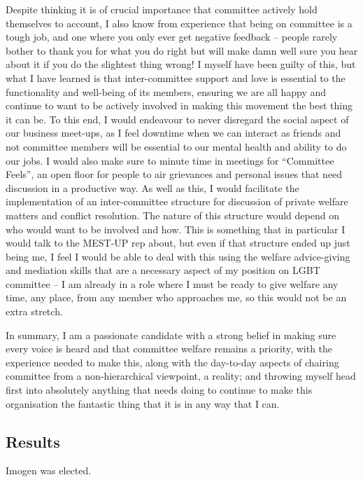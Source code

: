 \documentclass[a4paper, 11pt]{article} %
\begin{document}
\begin{onehalfspacing}
Despite thinking it is of crucial importance that committee actively hold themselves to account, I also know from experience that being on committee is a tough job, and one where you only ever get negative feedback – people rarely bother to thank you for what you do right but will make damn well sure you hear about it if you do the slightest thing wrong! I myself have been guilty of this, but what I have learned is that inter-committee support and love is essential to the functionality and well-being of its members, ensuring we are all happy and continue to want to be actively involved in making this movement the best thing it can be. To this end, I would endeavour to never disregard the social aspect of our business meet-ups, as I feel downtime when we can interact as friends and not committee members will be essential to our mental health and ability to do our jobs. I would also make sure to minute time in meetings for “Committee Feels”, an open floor for people to air grievances and personal issues that need discussion in a productive way. As well as this, I would facilitate the implementation of an inter-committee structure for discussion of private welfare matters and conflict resolution. The nature of this structure would depend on who would want to be involved and how. This is something that in particular I would talk to the MEST-UP rep about, but even if that structure ended up just being me, I feel I would be able to deal with this using the welfare advice-giving and mediation skills that are a necessary aspect of my position on LGBT committee – I am already in a role where I must be ready to give welfare any time, any place, from any member who approaches me, so this would not be an extra stretch.

In summary, I am a passionate candidate with a strong belief in making sure every voice is heard and that committee welfare remains a priority, with the experience needed to make this, along with the day-to-day aspects of chairing committee from a non-hierarchical viewpoint, a reality; and throwing myself head first into absolutely anything that needs doing to continue to make this organisation the fantastic thing that it is in any way that I can.

\end{onehalfspacing}

\subsection{Results}

Imogen was elected.
\end{document}
